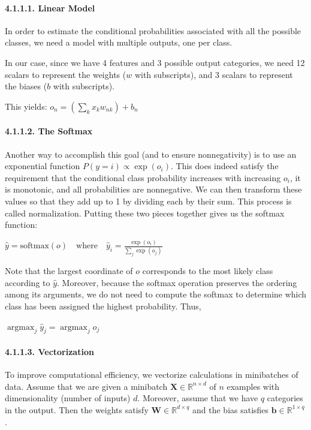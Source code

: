 \documentclass[11pt]{article}
\begin{document}
    \paragraph{4.1.1.1. Linear Model}\label{linear-model} \mbox{}

    In order to estimate the conditional probabilities associated with all
the possible classes, we need a model with multiple outputs, one per
class.

    In our case, since we have 4 features and 3 possible output categories,
we need 12 scalars to represent the weights (\(w\) with subscripts), and
3 scalars to represent the biases (\(b\) with subscripts).

    This yields: \(o_n = (\sum_k x_k w_{nk}) + b_n\)

    \paragraph{4.1.1.2. The Softmax}\label{the-softmax} \mbox{}

    Another way to accomplish this goal (and to ensure nonnegativity) is to
use an exponential function \(P(y = i) \propto \exp(o_i)\). This does
indeed satisfy the requirement that the conditional class probability
increases with increasing \(o_i\), it is monotonic, and all probabilities
are nonnegative. We can then transform these values so that they add up
to 1 by dividing each by their sum. This process is called
normalization. Putting these two pieces together gives us the softmax
function:

\(\hat{y} = \text{softmax}(o) \quad \text{where} \quad \hat{y}_i = \frac{\exp(o_i)}{\sum_j \exp(o_j)}\)

Note that the largest coordinate of \(o\) corresponds to the most likely
class according to \(\hat{y}\). Moreover, because the softmax operation
preserves the ordering among its arguments, we do not need to compute
the softmax to determine which class has been assigned the highest
probability. Thus,

\(\operatorname*{argmax}_j \hat{y}_j = \operatorname*{argmax}_j o_j\)

    \paragraph{4.1.1.3. Vectorization}\label{vectorization} \mbox{}

    To improve computational efficiency, we vectorize calculations in
minibatches of data. Assume that we are given a minibatch
\(\mathbf{X} \in \mathbb{R}^{n \times d}\) of \(n\) examples with
dimensionality (number of inputs) \(d\). Moreover, assume that we have
\(q\) categories in the output. Then the weights satisfy
\(\mathbf{W} \in \mathbb{R}^{d \times q}\) and the bias satisfies
\(\mathbf{b} \in \mathbb{R}^{1 \times q}\).
\end{document}
